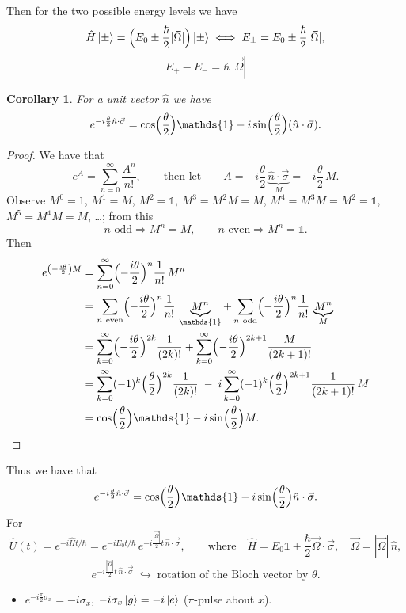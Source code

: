 \documentclass[12pt]{article}
\theoremstyle{plain}
\newtheorem*{corollary*}{Corollary}
\theoremstyle{remark}
\newcommand{\I}{\mathds{1}}
\newcommand{\vecb}[1]{\vec{#1}}
\newcommand{\hbf}[1]{\hat{#1}}
\newcommand{\Om}{\vecb{\Omega}}
\newcommand{\sig}{\vecb{\sigma}}
\begin{document}
Then for the two possible energy levels we have
\[
  \hat H\ket{\pm} = \Bigl(E_0 \pm \frac{\hbar}{2}|\Om|\Bigr)\ket{\pm}
  \iff E_\pm = E_0 \pm \frac{\hbar}{2}|\Om| ,
\]
\[
  \boxed{\; E_+ - E_- = \hbar\,|\Om| \;}
\]

\begin{corollary*}
For a unit vector $\hbf{n}$ we have
\[
  e^{-i\frac{\theta}{2}\hbf{n}\cdot\sig} = \cos\Bigl(\frac{\theta}{2}\Bigr)\I - i\sin\Bigl(\frac{\theta}{2}\Bigr)(\hbf{n}\cdot\sig) .
\]
\end{corollary*}
\begin{proof}
We have that
\[
  e^A = \sum_{n=0}^{\infty}\frac{A^n}{n!} ,
  \qquad\text{then let}\qquad
  A = -i\frac{\theta}{2}\,\underbrace{\hbf{n}\cdot\sig}_{M} = -i\frac{\theta}{2}\,M .
\]
Observe $M^0 = 1$, $M^1 = M$, $M^2 = \I$, $M^3 = M^2 M = M$, $M^4 = M^3 M = M^2 = \I$, $M^5 = M^4 M = M$, \dots; from this
\[
  n \text{ odd} \Rightarrow M^n = M, \qquad n \text{ even} \Rightarrow M^n = \I .
\]
Then
\begin{align*}
  e^{\left(-\frac{i\theta}{2}\right)M}
  &= \sum_{n=0}^{\infty}\Bigl(-\frac{i\theta}{2}\Bigr)^n \frac{1}{n!}\,M^n \\
  &= \sum_{n\ \text{even}}\Bigl(-\frac{i\theta}{2}\Bigr)^n \frac{1}{n!}\,\underbrace{M^n}_{\I}
   + \sum_{n\ \text{odd}}\Bigl(-\frac{i\theta}{2}\Bigr)^n \frac{1}{n!}\,\underbrace{M^n}_{M} \\
  &= \sum_{k=0}^{\infty}\Bigl(-\frac{i\theta}{2}\Bigr)^{2k}\frac{1}{(2k)!}
   + \sum_{k=0}^{\infty}\Bigl(-\frac{i\theta}{2}\Bigr)^{2k+1}\frac{M}{(2k+1)!} \\
  &= \sum_{k=0}^{\infty}(-1)^k\Bigl(\frac{\theta}{2}\Bigr)^{2k}\frac{1}{(2k)!}
   \;-\; i\sum_{k=0}^{\infty}(-1)^k\Bigl(\frac{\theta}{2}\Bigr)^{2k+1}\frac{1}{(2k+1)!}\,M \\
  &= \cos\Bigl(\frac{\theta}{2}\Bigr)\I - i\sin\Bigl(\frac{\theta}{2}\Bigr)M . \qedhere
\end{align*}
\end{proof}

Thus we have that
\[
  e^{-i\frac{\theta}{2}\hbf{n}\cdot\sig} = \cos\Bigl(\frac{\theta}{2}\Bigr)\I - i\sin\Bigl(\frac{\theta}{2}\Bigr)\hbf{n}\cdot\sig .
\]
For
\[
  \hat U(t) = e^{-i\hat H t/\hbar} = e^{-iE_0 t/\hbar}\, e^{-i\frac{|\Om|}{2} t\,\hbf{n}\cdot\sig} ,
  \qquad\text{where}\quad \hat H = E_0\I + \frac{\hbar}{2}\Om\cdot\sig, \quad \Om = |\Om|\,\hbf{n} ,
\]
\[
  e^{-i\frac{|\Om|}{2} t\,\hbf{n}\cdot\sig} \;\hookrightarrow\; \text{rotation of the Bloch vector by } \theta .
\]
\begin{itemize}
  \item $e^{-i\frac{\pi}{2}\sigma_x} = -i\sigma_x$, \quad $-i\sigma_x\ket{g} = -i\ket{e}$ \quad ($\pi$-pulse about $x$).
\end{itemize}
\end{document}
